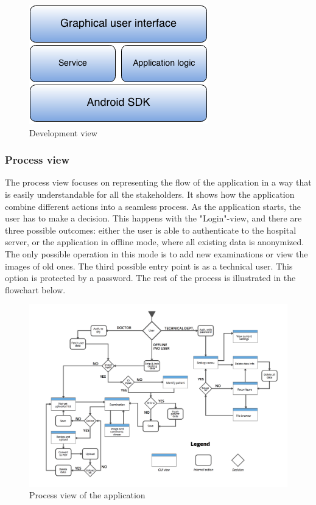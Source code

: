 \begin{figure}[H]
\centering
\includegraphics[scale=0.7]{img/development_view.png}
\caption{Development view}
\label{fig:development_view}
\end{figure}


\subsubsection{Process view}
The process view focuses on representing the flow of the application in a way that is easily understandable for all the stakeholders. It shows how the application combine different actions into a seamless process. As the application starts, the user has to make a decision. This happens with the "Login"-view, and there are three possible outcomes: either the user is able to authenticate to the hospital server, or the application in offline mode, where all existing data is anonymized. The only possible operation in this mode is to add new examinations or view the images of old ones. The third possible entry point is as a technical user. This option is protected by a password. The rest of the process is illustrated in the flowchart below.

\begin{figure}
    \centering
    \includegraphics[scale=0.45]{img/flowchart.png}
    \caption{Process view of the application}
    \label{fig:flowchart}
\end{figure}
\newpage


